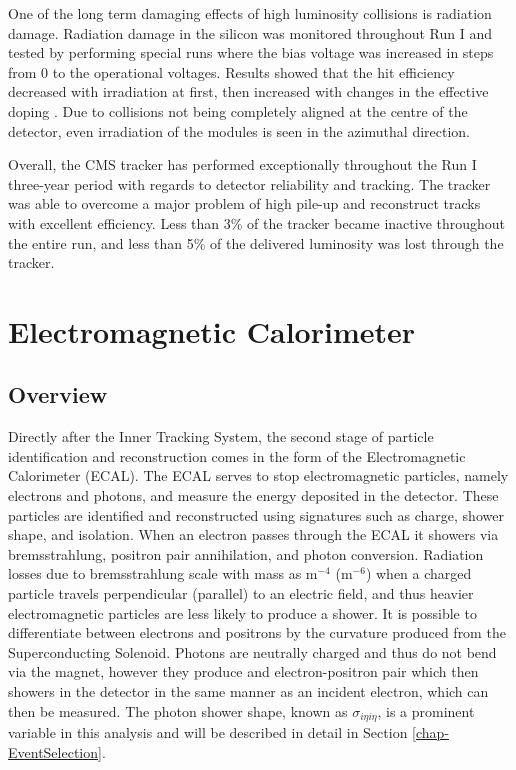 One of the long term damaging effects of high luminosity collisions is radiation damage. Radiation damage in the silicon was monitored throughout Run I and tested by performing special runs where the bias voltage was increased in steps from 0 to the operational voltages. Results showed that the hit efficiency decreased with irradiation at first, then increased with changes in the effective doping \cite{Doping}. Due to collisions not being completely aligned at the centre of the detector, even irradiation of the modules is seen in the azimuthal direction.

Overall, the CMS tracker has performed exceptionally throughout the Run I three-year period with regards to detector reliability and tracking. The tracker was able to overcome a major problem of high pile-up and reconstruct tracks with excellent efficiency. Less than 3\% of the tracker became inactive throughout the entire run, and less than 5\% of the delivered luminosity was lost through the tracker.    
 
\section{Electromagnetic Calorimeter} \label{sec-ElectromagneticCalorimeter}

\subsection{Overview} \label{subsec-ECALOverview}

Directly after the Inner Tracking System, the second stage of particle identification and reconstruction comes in the form of the Electromagnetic Calorimeter (ECAL). The ECAL serves to stop electromagnetic particles, namely electrons and photons, and measure the energy deposited in the detector. These particles are identified and reconstructed using signatures such as charge, shower shape, and isolation. When an electron passes through the ECAL it showers via bremsstrahlung, positron pair annihilation, and photon conversion. Radiation losses due to bremsstrahlung scale with mass as m$^{-4}$ (m$^{-6}$) when a charged particle travels perpendicular (parallel) to an electric field, and thus heavier electromagnetic particles are less likely to produce a shower. It is possible to differentiate between electrons and positrons by the curvature produced from the Superconducting Solenoid. Photons are neutrally charged and thus do not bend via the magnet, however they produce and electron-positron pair which then showers in the detector in the same manner as an incident electron, which can then be measured. The photon shower shape, known as $\sigma_{i\eta i\eta}$, is a prominent variable in this analysis and will be described in detail in Section \ref{chap-EventSelection}.  

